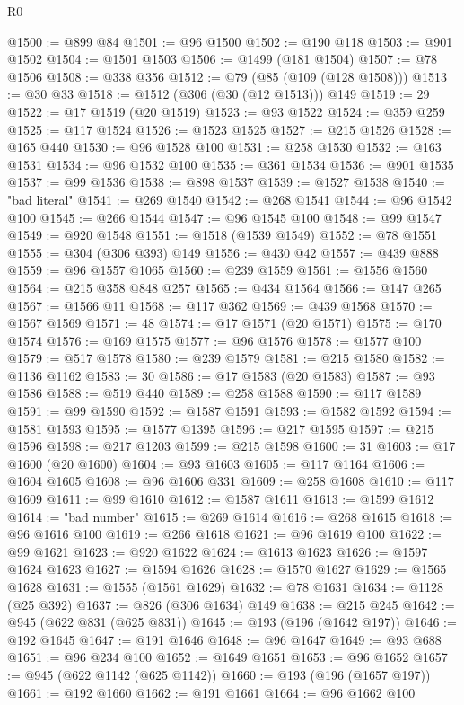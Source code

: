 \begin{lexlean}{R0}
\begin{coremodule}
@1500 := @899 @84
@1501 := @96 @1500
@1502 := @190 @118
@1503 := @901 @1502
@1504 := @1501 @1503
@1506 := @1499 (@181 @1504)
@1507 := @78 @1506
@1508 := @338 @356
@1512 := @79 (@85 (@109 (@128 @1508)))
@1513 := @30 @33
@1518 := @1512 (@306 (@30 (@12 @1513))) @149
@1519 := 29
@1522 := @17 @1519 (@20 @1519)
@1523 := @93 @1522
@1524 := @359 @259
@1525 := @117 @1524
@1526 := @1523 @1525
@1527 := @215 @1526
@1528 := @165 @440
@1530 := @96 @1528 @100
@1531 := @258 @1530
@1532 := @163 @1531
@1534 := @96 @1532 @100
@1535 := @361 @1534
@1536 := @901 @1535
@1537 := @99 @1536
@1538 := @898 @1537
@1539 := @1527 @1538
@1540 := "bad literal"
@1541 := @269 @1540
@1542 := @268 @1541
@1544 := @96 @1542 @100
@1545 := @266 @1544
@1547 := @96 @1545 @100
@1548 := @99 @1547
@1549 := @920 @1548
@1551 := @1518 (@1539 @1549)
@1552 := @78 @1551
@1555 := @304 (@306 @393) @149
@1556 := @430 @42
@1557 := @439 @888
@1559 := @96 @1557 @1065
@1560 := @239 @1559
@1561 := @1556 @1560
@1564 := @215 @358 @848 @257
@1565 := @434 @1564
@1566 := @147 @265
@1567 := @1566 @11
@1568 := @117 @362
@1569 := @439 @1568
@1570 := @1567 @1569
@1571 := 48
@1574 := @17 @1571 (@20 @1571)
@1575 := @170 @1574
@1576 := @169 @1575
@1577 := @96 @1576
@1578 := @1577 @100
@1579 := @517 @1578
@1580 := @239 @1579
@1581 := @215 @1580
@1582 := @1136 @1162
@1583 := 30
@1586 := @17 @1583 (@20 @1583)
@1587 := @93 @1586
@1588 := @519 @440
@1589 := @258 @1588
@1590 := @117 @1589
@1591 := @99 @1590
@1592 := @1587 @1591
@1593 := @1582 @1592
@1594 := @1581 @1593
@1595 := @1577 @1395
@1596 := @217 @1595
@1597 := @215 @1596
@1598 := @217 @1203
@1599 := @215 @1598
@1600 := 31
@1603 := @17 @1600 (@20 @1600)
@1604 := @93 @1603
@1605 := @117 @1164
@1606 := @1604 @1605
@1608 := @96 @1606 @331
@1609 := @258 @1608
@1610 := @117 @1609
@1611 := @99 @1610
@1612 := @1587 @1611
@1613 := @1599 @1612
@1614 := "bad number"
@1615 := @269 @1614
@1616 := @268 @1615
@1618 := @96 @1616 @100
@1619 := @266 @1618
@1621 := @96 @1619 @100
@1622 := @99 @1621
@1623 := @920 @1622
@1624 := @1613 @1623
@1626 := @1597 @1624 @1623
@1627 := @1594 @1626
@1628 := @1570 @1627
@1629 := @1565 @1628
@1631 := @1555 (@1561 @1629)
@1632 := @78 @1631
@1634 := @1128 (@25 @392)
@1637 := @826 (@306 @1634) @149
@1638 := @215 @245
@1642 := @945 (@622 @831 (@625 @831))
@1645 := @193 (@196 (@1642 @197))
@1646 := @192 @1645
@1647 := @191 @1646
@1648 := @96 @1647
@1649 := @93 @688
@1651 := @96 @234 @100
@1652 := @1649 @1651
@1653 := @96 @1652
@1657 := @945 (@622 @1142 (@625 @1142))
@1660 := @193 (@196 (@1657 @197))
@1661 := @192 @1660
@1662 := @191 @1661
@1664 := @96 @1662 @100

\end{coremodule}
\end{lexlean}
